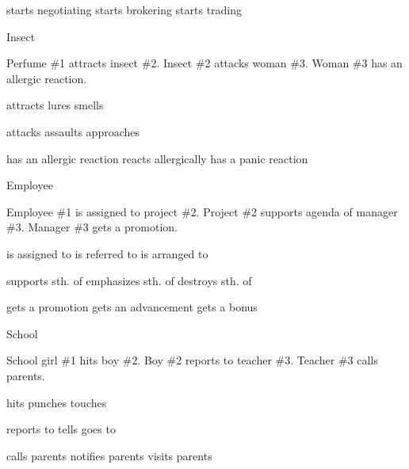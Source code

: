 starts negotiating
starts brokering
starts trading


Insect

Perfume \#1 attracts insect \#2.
Insect \#2 attacks woman \#3.
Woman \#3 has an allergic reaction.

attracts
lures
smells

attacks
assaults
approaches

has an allergic reaction
reacts allergically
has a panic reaction


Employee

Employee \#1 is assigned to project \#2.
Project \#2 supports agenda of manager \#3.
Manager \#3 gets a promotion.

is assigned to
is referred to
is arranged to

supports sth. of
emphasizes sth. of
destroys sth. of

gets a promotion
gets an advancement
gets a bonus


School

School girl \#1 hits boy \#2.
Boy \#2 reports to teacher \#3.
Teacher \#3 calls parents.

hits
punches
touches

reports to
tells
goes to

calls parents
notifies parents
visits parents
